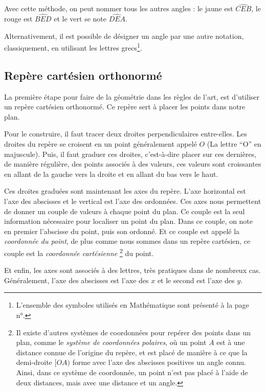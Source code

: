 \documentclass[a4paper, twoside]{article}
\begin{document}
Avec cette méthode, on peut nommer tous les autres angles :
le jaune est $\widehat{CEB}$, le rouge est $\widehat{BED}$ et le vert se note $\widehat{DEA}$.

Alternativement, il est possible de désigner un angle par une autre notation, classiquement, en utilisant les
lettres grecs\footnote{L'ensemble des symboles utilisés en Mathématique sont présenté à la page n°\pageref{symboles_math}.}.



\newpage

\subsection{Repère cartésien orthonormé}

La première étape pour faire de la géométrie dans les règles de l'art,
est d'utiliser un repère cartésien orthonormé.
Ce repère sert à placer les points dans notre plan.

\medbreak

Pour le construire, il faut tracer deux droites perpendiculaires entre-elles.
Les droites du repère se croisent en un point généralement appelé $O$
(La lettre “O” en majuscule). Puis, il faut graduer ces droites,
c'est-à-dire placer sur ces dernières, de manière régulière, des points associés à des valeurs,
ces valeurs sont croissantes en allant de la gauche vers la droite et en allant du bas vers le haut.

Ces droites graduées sont maintenant les axes du repère.
L'axe horizontal est l'axe des abscisses et le vertical est l'axe des ordonnées.
Ces axes nous permettent de donner un couple de valeurs à chaque point du plan.
Ce couple est la seul information nécessaire pour localiser un point du plan.
Dans ce couple, on note en premier l'abscisse du point, puis son ordonné.
Et ce couple est appelé la \emph{coordonnée du point}, de plus comme nous sommes
dans un repère cartésien, ce couple est la \emph{coordonnée cartésienne}
\footnote{Il existe d'autres systèmes de coordonnées pour repérer des points dans un plan,
comme le \emph{système de coordonnées polaires}, où un point $A$ est à une distance connue de
l'origine du repère, et est placé de manière à ce que la demi-droite $[OA)$
forme avec l'axe des abscisses positives un angle connu.
Ainsi, dans ce système de coordonnée, un point n'est pas placé à l'aide de deux distances,
mais avec une distance et un angle.} du point.

\medbreak

Et enfin, les axes sont associés à des lettres, très pratiques dans de nombreux cas.
Généralement, l'axe des abscisses est l'axe des $x$ et le second est l'axe des $y$.
\end{document}
